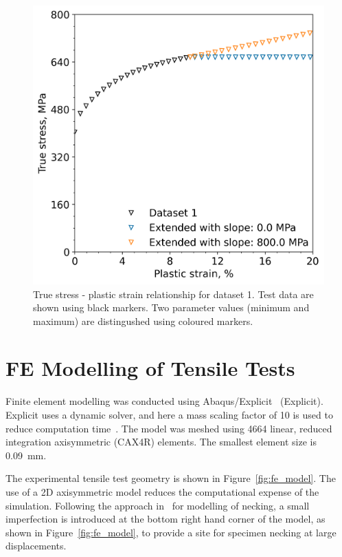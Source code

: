 \documentclass[preprint, review, 12pt]{elsarticle}
\begin{document}
	\begin{figure}[!htbp]
		\centering
		\includegraphics[width=\linewidth, height=0.4\textheight, keepaspectratio]{ABAQUS_SLOPE_COMPARISON}
		\caption{True stress - plastic strain relationship for dataset 1. Test data are shown using black markers. Two parameter values (minimum and maximum) are distingushed using coloured markers.}
		\label{fig:extending_uts}
	\end{figure}

	\section{FE Modelling of Tensile Tests}
	\label{h:fem}

	Finite element modelling was conducted using Abaqus/Explicit~\cite{DASSAULT2021} (Explicit).
	Explicit uses a dynamic solver, and here a mass scaling factor of 10 is used to reduce computation time~\cite{DASSAULT2021}.
	The model was meshed using 4664 linear, reduced integration axisymmetric (CAX4R) elements.
	The smallest element size is 0.09~mm.

	The experimental tensile test geometry is shown in Figure~\ref{fig:fe_model}.
	The use of a 2D axisymmetric model reduces the computational expense of the simulation.
	Following the approach in~\cite{DASSAULT2021} for modelling of necking, a small imperfection is introduced at the bottom right hand corner of the model, as shown in Figure~\ref{fig:fe_model}, to provide a site for specimen necking at large displacements.
\end{document}
